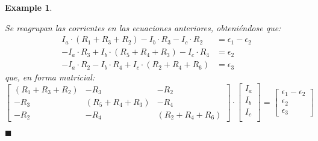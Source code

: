 \documentclass[11pt]{book} %
\numberwithin{dummy}{section}
\theoremstyle{ocrenumbox}
\theoremstyle{blacknumex}
\newtheorem{exampleT}{Example}[chapter]
\theoremstyle{blacknumbox}
\theoremstyle{ocrenum}
\newenvironment{example}{\begin{exampleT}}{\hfill{\tiny\ensuremath{\blacksquare}}\end{exampleT}}
\begin{document}
\begin{example}
\begin{enumerate}
			Se reagrupan las corrientes en las ecuaciones anteriores, obteniéndose que: 
			\begin{align*}
				I_a \cdot (R_1 + R_3 + R_2)  - I_b\cdot R_3 - I_c \cdot R_2 &= \epsilon_1 - \epsilon_2\\
				- I_a \cdot R_3 + I_b \cdot (R_5 + R_4 + R_3) - I_c \cdot R_4 &=  \epsilon_2\\
				- I_a \cdot R_2 - I_b \cdot R_4 + I_c \cdot (R_2 + R_4 + R_6) &= \epsilon_3
			\end{align*}
			que, en forma matricial: 
			\begin{equation*}
				\begin{bmatrix}
					(R_1 + R_3 + R_2) &  - R_3 & - R_2 \\
					- R_3 & (R_5 + R_4 + R_3) & - R_4 \\
					- R_2 & - R_4 &  (R_2 + R_4 + R_6)
				\end{bmatrix} \cdot %
				\begin{bmatrix}
					I_a\\
					I_b\\
					I_c\\
				\end{bmatrix} = %
				\begin{bmatrix}
					\epsilon_1 - \epsilon_2\\
					\epsilon_2\\
					\epsilon_3
				\end{bmatrix}
			\end{equation*}
		\end{enumerate}
	\end{example}
	
\end{document}
